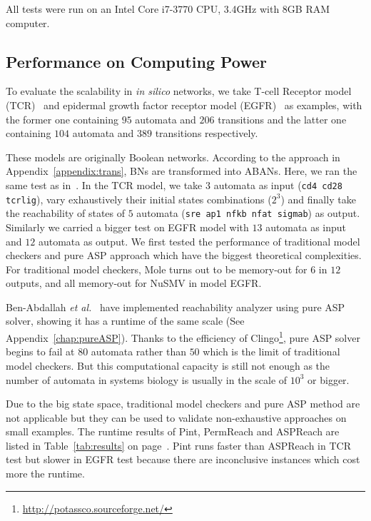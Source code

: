 All tests were run on an Intel Core i7-3770 CPU, \@3.4GHz with 8GB RAM computer.

\subsection{Performance on Computing Power}
To evaluate the scalability in \textit{in silico} networks, we take T-cell Receptor model (TCR)~\cite{saez2007logical} and epidermal growth factor receptor model (EGFR)~\cite{samaga2009logic} as examples, with the former one containing $95$ automata and $206$ transitions and the latter one containing $104$ automata and $389$ transitions respectively. 

These models are originally Boolean networks.
According to the approach in Appendix~\ref{appendix:trans}, BNs are transformed into ABANs. 
Here, we ran the same test as in~\cite{folschette2015}. In the TCR model, we take $3$ automata as input (\texttt{cd4 cd28 tcrlig}), vary exhaustively their initial states combinations ($2^3$) and finally take the reachability of states of $5$ automata (\texttt{sre ap1 nfkb nfat sigmab}) as output. 
Similarly we carried a bigger test on EGFR model with $13$ automata %
as input and $12$ automata %
as output.
We first tested the performance of traditional model checkers and pure ASP approach which have the biggest theoretical complexities. 
For traditional model checkers, Mole turns out to be memory-out for $6$ in $12$ outputs, and all memory-out for NuSMV in model EGFR. 

Ben-Abdallah \textit{et al.}~\cite{abdallah2015exhaustive} have implemented reachability analyzer using pure ASP solver, showing it has a runtime of the same scale (See Appendix~\ref{chap:pureASP}).
Thanks to the efficiency of Clingo\footnote{\url{http://potassco.sourceforge.net/}}, pure ASP solver begins to fail at $80$ automata rather than $50$ which is the limit of traditional model checkers. 
But this computational capacity is still not enough as the number of automata in systems biology is usually in the scale of $10^3$ or bigger.

Due to the big state space, traditional model checkers and pure ASP method are not applicable but they can be used to validate non-exhaustive approaches on small examples.
The runtime results of Pint, PermReach and ASPReach are listed in Table~\ref{tab:results} on page~\pageref{tab:results}.
Pint runs faster than ASPReach in TCR test but slower in EGFR test because there are inconclusive instances which cost more the runtime.

